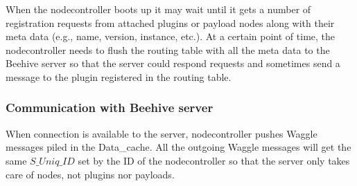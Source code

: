 When the nodecontroller boots up it may wait until it gets a number of registration requests from attached plugins or payload nodes along with their meta data 
(e.g., name, version, instance, etc.). At a certain point of time, the nodecontroller needs to flush the routing table with all the meta data to the Beehive 
server so that the server could respond requests and sometimes send a message to the plugin registered in the routing table.

\subsubsection{Communication with Beehive server}

When connection is available to the server, nodecontroller pushes Waggle messages piled in the Data\_cache. All the outgoing Waggle messages will get the same
$S\_Uniq\_ID$ set by the ID of the nodecontroller so that the server only takes care of nodes, not plugins nor payloads.

